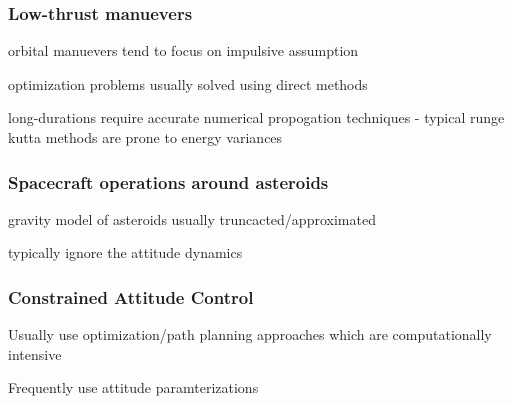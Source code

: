 

\begin{frame}[t]\frametitle{Low-thrust manuevers}
    
    orbital manuevers tend to focus on impulsive assumption

    optimization problems usually solved using direct methods

    long-durations require accurate numerical propogation techniques - typical runge kutta methods are prone to energy variances

\end{frame}

\begin{frame}[t]\frametitle{Spacecraft operations around asteroids}
    gravity model of asteroids usually truncacted/approximated

    typically ignore the attitude dynamics

\end{frame}

\begin{frame}[t]\frametitle{Constrained Attitude Control}
    
Usually use optimization/path planning approaches which are computationally intensive

Frequently use attitude paramterizations

\end{frame}